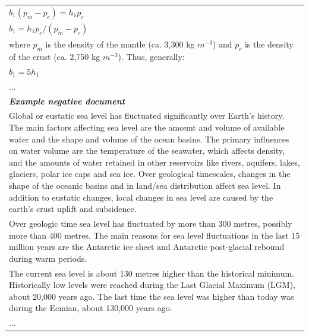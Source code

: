 \begin{table}[ht]
\begin{tabular}{p{13cm}}
$b_1(p_m-p_c)=h_1p_c$ \\
$b_1 = h_1p_c/(p_m-p_c)$ \\
where $p_m$ is the density of the mantle (ca. 3,300 kg $m^{-3}$) and 
$p_c$ is the density of the crust (ca. 2,750 kg $m^{-3}$). Thus, generally: \\
$b_1 = 5 h_1$ \\
... \\
\midrule
\textit{\textbf{Example negative document}} \\
\midrule
Global or eustatic sea level has fluctuated significantly over Earth's history. The main factors affecting sea level are the amount and volume of available water and the shape and volume of the ocean basins. The primary influences on water volume are the temperature of the seawater, which affects density, and the amounts of water retained in other reservoirs like rivers, aquifers, lakes, glaciers, polar ice caps and sea ice. Over geological timescales, changes in the shape of the oceanic basins and in land/sea distribution affect sea level. In addition to eustatic changes, local changes in sea level are caused by the earth's crust uplift and subsidence. \\

Over geologic time sea level has fluctuated by more than 300 metres, possibly more than 400 metres. The main reasons for sea level fluctuations in the last 15 million years are the Antarctic ice sheet and Antarctic post-glacial rebound during warm periods. \\

The current sea level is about 130 metres higher than the historical minimum. Historically low levels were reached during the Last Glacial Maximum (LGM), about 20,000 years ago. The last time the sea level was higher than today was during the Eemian, about 130,000 years ago. \\
... \\
\bottomrule
\end{tabular}
\label{tab:earth_science_example}
\end{table}